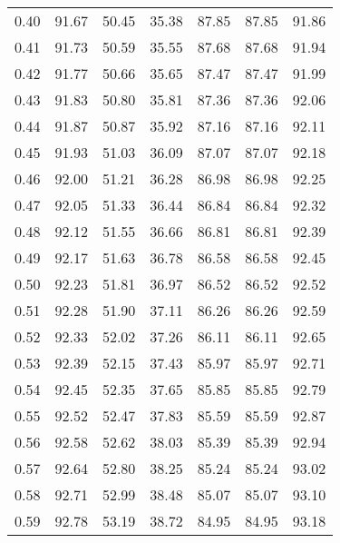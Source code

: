 \begin{tabular}{|c|c|c|c|c|c|c|}
      0.40 &     91.67 &     50.45 &      35.38 &   87.85 &      87.85 &         91.86 \\
      0.41 &     91.73 &     50.59 &      35.55 &   87.68 &      87.68 &         91.94 \\
      0.42 &     91.77 &     50.66 &      35.65 &   87.47 &      87.47 &         91.99 \\
      0.43 &     91.83 &     50.80 &      35.81 &   87.36 &      87.36 &         92.06 \\
      0.44 &     91.87 &     50.87 &      35.92 &   87.16 &      87.16 &         92.11 \\
      0.45 &     91.93 &     51.03 &      36.09 &   87.07 &      87.07 &         92.18 \\
      0.46 &     92.00 &     51.21 &      36.28 &   86.98 &      86.98 &         92.25 \\
      0.47 &     92.05 &     51.33 &      36.44 &   86.84 &      86.84 &         92.32 \\
      0.48 &     92.12 &     51.55 &      36.66 &   86.81 &      86.81 &         92.39 \\
      0.49 &     92.17 &     51.63 &      36.78 &   86.58 &      86.58 &         92.45 \\
      0.50 &     92.23 &     51.81 &      36.97 &   86.52 &      86.52 &         92.52 \\
      0.51 &     92.28 &     51.90 &      37.11 &   86.26 &      86.26 &         92.59 \\
      0.52 &     92.33 &     52.02 &      37.26 &   86.11 &      86.11 &         92.65 \\
      0.53 &     92.39 &     52.15 &      37.43 &   85.97 &      85.97 &         92.71 \\
      0.54 &     92.45 &     52.35 &      37.65 &   85.85 &      85.85 &         92.79 \\
      0.55 &     92.52 &     52.47 &      37.83 &   85.59 &      85.59 &         92.87 \\
      0.56 &     92.58 &     52.62 &      38.03 &   85.39 &      85.39 &         92.94 \\
      0.57 &     92.64 &     52.80 &      38.25 &   85.24 &      85.24 &         93.02 \\
      0.58 &     92.71 &     52.99 &      38.48 &   85.07 &      85.07 &         93.10 \\
      0.59 &     92.78 &     53.19 &      38.72 &   84.95 &      84.95 &         93.18 \\

\end{tabular}
